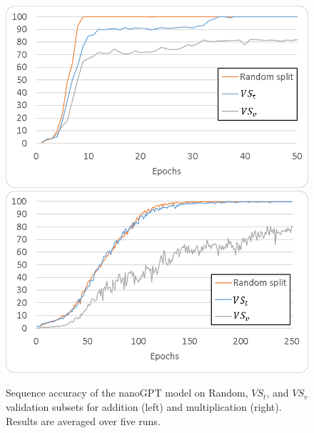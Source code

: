 \documentclass[final,1p,times,authoryear]{elsarticle}
\begin{document}
\begin{figure}[h]
\begin{center}
\includegraphics[scale=1.05]{NanoGPTVStVSvSeqAccuracyAdd}
\includegraphics[scale=1.05]{NanoGPTVStVSvSeqAccuracyMul}
\end{center}
\caption{Sequence accuracy of the nanoGPT model on Random, $VS_t$, and $VS_v$ validation subsets for addition (left) and multiplication (right). Results are averaged over five runs.}
\label{figure:NanoGPTVStVSvSeqAccuracy}
\end{figure}


\end{document}
